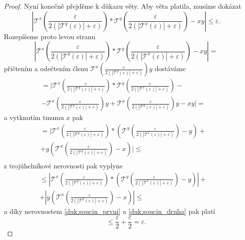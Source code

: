\begin{theorem}
\begin{proof}
Nyní konečně přejděme k důkazu věty. Aby věta platila, musíme dokázat
\begin{equation}
\left| \mathcal{T}^x\left(\frac{\varepsilon}{2(|\mathcal{T}^y(\varepsilon)|+\varepsilon)}\right) *\mathcal{T}^y\left(\frac{\varepsilon}{2(|\mathcal{T}^x(\varepsilon)|+\varepsilon)}\right) -xy \right|\leq\varepsilon.
\end{equation}
Rozepíšeme proto levou stranu
\begin{equation}
\left| \mathcal{T}^x\left(\frac{\varepsilon}{2(|\mathcal{T}^y(\varepsilon)|+\varepsilon)}\right) *\mathcal{T}^y\left(\frac{\varepsilon}{2(|\mathcal{T}^x(\varepsilon)|+\varepsilon)}\right) -xy \right| =
\end{equation}
přičtením a odečtením členu $\mathcal{T}^x\left(\frac{\varepsilon}{2(|\mathcal{T}^y(\varepsilon)|+\varepsilon)} \right)y$ dostáváme
\begin{equation}
\begin{split}=\bigl\vert \mathcal{T}^x\left(\frac{\varepsilon}{2(|\mathcal{T}^y(\varepsilon)|+\varepsilon)}\right) *\mathcal{T}^y\left(\frac{\varepsilon}{2(|\mathcal{T}^x(\varepsilon)|+\varepsilon)}\right) -&
\\-\mathcal{T}^x\left(\frac{\varepsilon}{2(|\mathcal{T}^y(\varepsilon)|+\varepsilon)} \right)y + \mathcal{T}^x\left(\frac{\varepsilon}{2(|\mathcal{T}^y(\varepsilon)|+\varepsilon)} \right)y -xy \bigr\vert =&
\end{split}
\end{equation}
a vytknutím tmumu $x$ pak
\begin{equation}
\begin{split}
= \bigl\vert \mathcal{T}^x\left(\frac{\varepsilon}{2(|\mathcal{T}^y(\varepsilon)|+\varepsilon)}\right) *\left(\mathcal{T}^y\left(\frac{\varepsilon}{2(|\mathcal{T}^x(\varepsilon)|+\varepsilon)}\right) - y\right)+&\\
+y\left(\mathcal{T}^x\left(\frac{\varepsilon}{2(|\mathcal{T}^y(\varepsilon)|+\varepsilon)} \right) - x \right)\bigr\vert\leq&\\
\end{split}
\end{equation}
z trojúhelníkové nerovnosti pak vyplyne
\begin{equation}
\begin{split}
\leq \left| \mathcal{T}^x\left(\frac{\varepsilon}{2(|\mathcal{T}^y(\varepsilon)|+\varepsilon)}\right) *\left(\mathcal{T}^y\left(\frac{\varepsilon}{2(|\mathcal{T}^x(\varepsilon)|+\varepsilon)}\right) - y\right)\right|+&\\
+\left|y\left(\mathcal{T}^x\left(\frac{\varepsilon}{2(|\mathcal{T}^y(\varepsilon)|+\varepsilon)} \right) - x \right)\right|\leq
\end{split}
\end{equation}
a díky nerovnostem \ref{duk:soucin_prvni} a \ref{duk:soucin_druha} pak platí
\begin{equation}
\leq\frac{\varepsilon}{2}+\frac{\varepsilon}{2}=\varepsilon.
\end{equation}
\end{proof}
\end{theorem}


